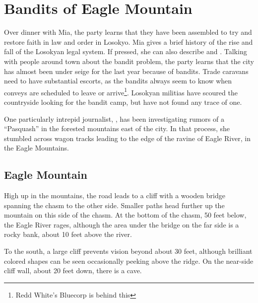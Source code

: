 \section{Bandits of Eagle Mountain}

Over dinner with Mia, the party learns that they have been assembled to try and restore faith in law and order in Losokyo. Mia gives a brief history of the rise and fall of the Losokyan legal system. If pressed, she can also describe  and .
Talking with people around town about the bandit problem, the party learns that the city has almost been under seige for the last year because of bandits. Trade caravans need to have substantial escorts, as the bandits always seem to know when conveys are scheduled to leave or arrive\footnote{Redd White's Bluecorp is behind this}. Losokyan militias have scoured the countryside looking for the bandit camp, but have not found any trace of one.

One particularly intrepid journalist, , has been investigating rumors of a ``Pasquash'' in the forested mountains east of the city. In that process, she stumbled across wagon tracks leading to the edge of the ravine of Eagle River, in the Eagle Mountains. 

\subsection{Eagle Mountain}
High up in the mountains, the road leads to a cliff with a wooden bridge spanning the chasm to the other side. Smaller paths head further up the mountain on this side of the chasm. At the bottom of the chasm, 50 feet below, the Eagle River rages, although the area under the bridge on the far side is a rocky bank, about 10 feet above the river. 

To the south, a large cliff prevents vision beyond about 30 feet, although brilliant colored shapes can be seen occasionally peeking above the ridge. On the near-side cliff wall, about 20 feet down, there is a cave. 

